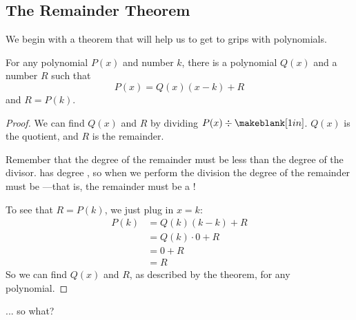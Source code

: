 \subsection{The Remainder Theorem} 
We begin with a theorem that will help us to get to grips with polynomials.
\begin{theorem}
For any polynomial $P(x)$ and number $k$, there is a polynomial $Q(x)$ and a number $R$ such that
\[
P(x)=Q(x)(x-k)+R
\]
and $R=P(k)$.
\end{theorem}
\begin{proof}
We can find $Q(x)$ and $R$ by dividing $P(x)\div\makeblank[1in]$. $Q(x)$ is the quotient, and $R$ is the remainder.

Remember that the degree of the remainder must be less than the degree of the divisor. \makeblank[1in] has degree \makeblank[.5in], so when we perform the division the degree of the remainder must be \makeblank[.5in]---that is, the remainder must be a \makeblank[1in]!

To see that $R=P(k)$, we just plug in $x=k$:
\begin{align*}
P(k)&=Q(k)(k-k)+R\\
&=Q(k)\cdot 0+R\\
&=0+R\\
&=R
\end{align*}
So we can find $Q(x)$ and $R$, as described by the theorem, for any polynomial.
\end{proof}
\vfill
\noindent... so what?